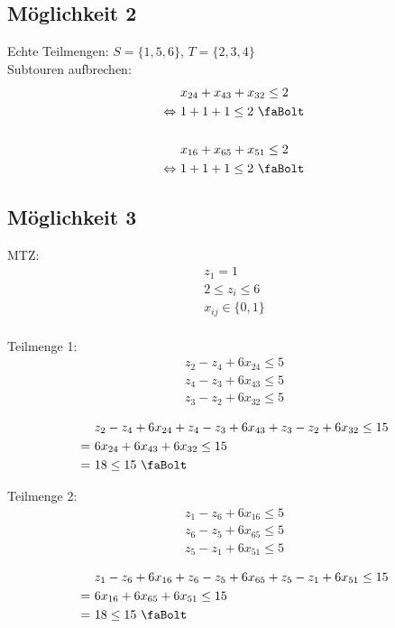 \documentclass[a4paper,11pt]{article}
\begin{document}
\subsection*{Möglichkeit 2}
Echte Teilmengen: $S = \{ 1, 5, 6 \}$, $T = \{ 2, 3, 4 \}$ \\

Subtouren aufbrechen:
\begin{align*}
    &x_{24} + x_{43} + x_{32} \le 2 \\
    \Leftrightarrow ~& 1 + 1 + 1 \le 2 ~\text{\faBolt} \\
    \\
    &x_{16} + x_{65} + x_{51} \le 2 \\
    \Leftrightarrow ~& 1 + 1 + 1 \le 2 ~\text{\faBolt} \\
\end{align*}

\subsection*{Möglichkeit 3}

MTZ:
\begin{align*}
    z_1 = 1 \\
    2 \le z_i \le 6 \\
    x_{ij} \in \{0, 1\} \\
\end{align*}

Teilmenge 1:
\begin{align*}
    z_2 - z_4 + 6x_{24} \le 5 \\
    z_4 - z_3 + 6x_{43} \le 5 \\
    z_3 - z_2 + 6x_{32} \le 5
\end{align*}

\begin{align*}
    & z_2 - z_4 + 6x_{24} + z_4 - z_3 + 6x_{43} + z_3 - z_2 + 6x_{32} \le 15 \\
    =~&  6x_{24} + 6x_{43} + 6x_{32} \le 15 \\
    =~& 18 \le 15 ~\text{\faBolt} \\
\end{align*}

Teilmenge 2:
\begin{align*}
    z_1 - z_6 + 6x_{16} \le 5 \\
    z_6 - z_5 + 6x_{65} \le 5 \\
    z_5 - z_1 + 6x_{51} \le 5
\end{align*}

\begin{align*}
    & z_1 - z_6 + 6x_{16} + z_6 - z_5 + 6x_{65} + z_5 - z_1 + 6x_{51} \le 15 \\
    =~& 6x_{16} + 6x_{65} + 6x_{51} \le 15 \\
    =~& 18 \le 15 ~\text{\faBolt} \\
\end{align*}
\end{document}
